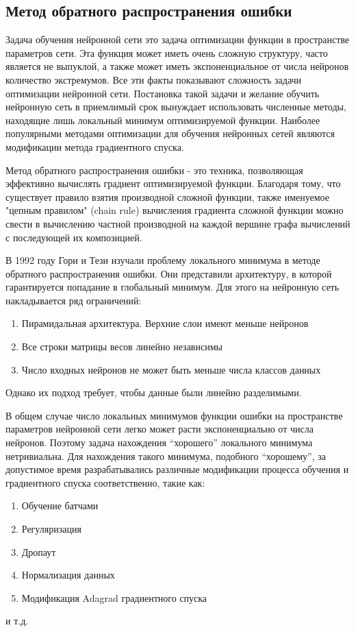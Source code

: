 \subsection{Метод обратного распространения ошибки}
Задача обучения нейронной сети это задача оптимизации функции в пространстве параметров сети. Эта функция может иметь очень сложную структуру, часто является не выпуклой, а также может иметь экспоненциальное от числа нейронов количество экстремумов\cite{deeplearning}. Все эти факты показывают сложность задачи оптимизации нейронной сети. Постановка такой задачи и желание обучить нейронную сеть в приемлимый срок вынуждает использовать численные методы, находящие лишь локальный минимум оптимизируемой функции. Наиболее популярными методами оптимизации для обучения нейронных сетей являются модификации метода градиентного спуска.
\par
Метод обратного распространения ошибки - это техника, позволяющая эффективно вычислять градиент оптимизируемой функции. Благодаря тому, что существует правило взятия производной сложной функции, также именуемое "цепным правилом" (chain rule) вычисления градиента сложной функции можно свести в вычислению частной производной на каждой вершине графа вычислений с последующей их композицией.
\par
В 1992 году Гори и Тези\cite{goritesi} изучали проблему локального минимума в методе обратного распространения ошибки. Они представили архитектуру, в которой гарантируется попадание в глобальный минимум. Для этого на нейронную сеть накладывается ряд ограничений:
\begin{enumerate}
	\item Пирамидальная архитектура. Верхние слои имеют меньше нейронов
	\item Все строки матрицы весов линейно независимы
	\item Число входных нейронов не может быть меньше числа классов данных
\end{enumerate}
Однако их подход требует, чтобы данные были линейно разделимыми. 
\par
В общем случае число локальных минимумов функции ошибки на пространстве параметров нейронной сети легко может расти экспоненциально от числа нейронов. Поэтому задача нахождения “хорошего” локального минимума нетривиальна. Для нахождения такого минимума, подобного “хорошему”, за допустимое время разрабатывались различные модификации процесса обучения и градиентного спуска соответственно, такие как:
\begin{enumerate}
	\item Обучение батчами
	\item Регуляризация
	\item Дропаут
	\item Нормализация данных
	\item Модификация Adagrad градиентного спуска
\end{enumerate}
и т.д.
